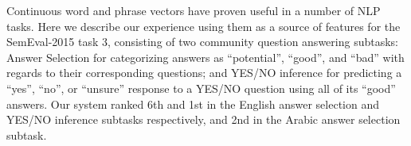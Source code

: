Continuous word and phrase vectors have proven useful in a number of NLP tasks. Here we describe our experience using them as a source of features for the SemEval-2015 task 3, consisting of two community question answering subtasks: Answer Selection for categorizing answers as ``potential'', ``good'', and ``bad'' with regards to their corresponding questions; and YES/NO inference for predicting a ``yes'', ``no'', or ``unsure'' response to a YES/NO question using all of its ``good'' answers. Our system ranked 6th and 1st in the English answer selection and YES/NO inference subtasks respectively, and 2nd in the Arabic answer selection subtask.
